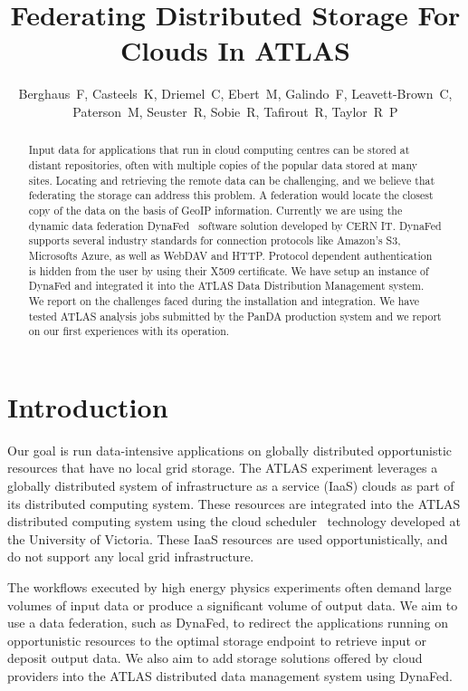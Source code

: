 \documentclass[a4paper]{jpconf}
\begin{document}
\title{Federating Distributed Storage For Clouds In ATLAS}

\author{Berghaus~F, Casteels~K, Driemel~C, Ebert~M, Galindo~F, Leavett-Brown~C, Paterson~M, Seuster~R, Sobie~R, Tafirout~R, Taylor~R~P}

\address{Frank~Berghaus, G07810, CERN, CH-1211 Geneva 23,  Switzerland}


\begin{abstract}
Input data for applications that run in cloud computing centres can be stored at distant repositories, often with multiple copies of the popular data stored at many sites. Locating and retrieving the remote data can be challenging, and we believe that federating the storage can address this problem. A federation would locate the closest copy of the data on the basis of GeoIP information. Currently we are using the dynamic data federation DynaFed~\cite{dynafed} software solution developed by CERN IT. DynaFed supports several industry standards for connection protocols like Amazon's S3, Microsofts Azure, as well as WebDAV and HTTP. Protocol dependent authentication is hidden from the user by using their X509 certificate. We have setup an instance of DynaFed and integrated it into the ATLAS Data Distribution Management system. We report on the challenges faced during the installation and integration. We have tested ATLAS analysis jobs submitted by the PanDA production system and we report on our first experiences with its operation.
\end{abstract}

\section{Introduction}
Our goal is run data-intensive applications on globally distributed opportunistic resources that have no local grid storage. The ATLAS experiment leverages a globally distributed system of infrastructure as a service (IaaS) clouds as part of its distributed computing system. These resources are integrated into the ATLAS distributed computing system using the cloud scheduler~\cite{cloud-scheduler} technology developed at the University of Victoria. These IaaS resources are used opportunistically, and do not support any local grid infrastructure.

The workflows executed by high energy physics experiments often demand large volumes of input data or produce a significant volume of output data. We aim to use a data federation, such as DynaFed, to redirect the applications running on opportunistic resources to the optimal storage endpoint to retrieve input or deposit output data. We also aim to add storage solutions offered by cloud providers into the ATLAS distributed data management system using DynaFed.
\end{document}
